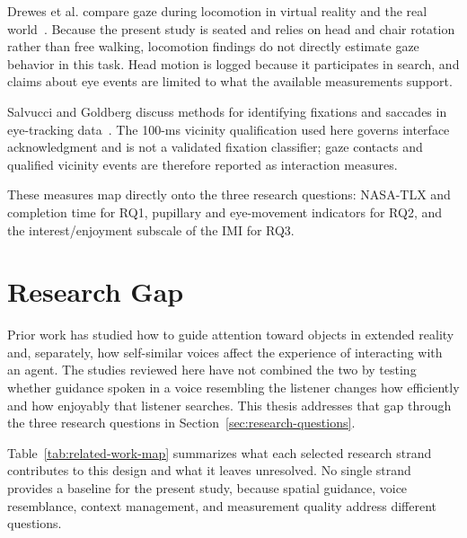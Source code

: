 Drewes et al. compare gaze during locomotion in virtual reality and the real world~\cite{drewes2021locomotion}. Because the present study is seated and relies on head and chair rotation rather than free walking, locomotion findings do not directly estimate gaze behavior in this task. Head motion is logged because it participates in search, and claims about eye events are limited to what the available measurements support.

Salvucci and Goldberg discuss methods for identifying fixations and saccades in eye-tracking data~\cite{salvucci2000fixations}. The 100-ms vicinity qualification used here governs interface acknowledgment and is not a validated fixation classifier; gaze contacts and qualified vicinity events are therefore reported as interaction measures.

These measures map directly onto the three research questions: NASA-TLX and completion time for RQ1, pupillary and eye-movement indicators for RQ2, and the interest/enjoyment subscale of the IMI for RQ3.

\section{Research Gap}
Prior work has studied how to guide attention toward objects in extended reality and, separately, how self-similar voices affect the experience of interacting with an agent. The studies reviewed here have not combined the two by testing whether guidance spoken in a voice resembling the listener changes how efficiently and how enjoyably that listener searches. This thesis addresses that gap through the three research questions in Section~\ref{sec:research-questions}.


Table~\ref{tab:related-work-map} summarizes what each selected research strand contributes to this design and what it leaves unresolved. No single strand provides a baseline for the present study, because spatial guidance, voice resemblance, context management, and measurement quality address different questions.

